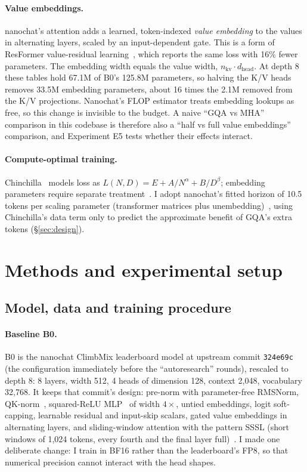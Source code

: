 \documentclass[10pt,twocolumn]{article}
\newcommand{\BO}{B0}
\begin{document}
\paragraph{Value embeddings.}
nanochat's attention adds a learned, token-indexed \emph{value embedding} to the values in alternating layers, scaled
by an input-dependent gate. This is a form of ResFormer value-residual learning~\cite{zhou2024value}, which reports
the same loss with 16\% fewer parameters. The embedding width equals the value width, $n_\text{kv}\cdot d_\text{head}$.
At depth 8 these tables hold 67.1M of B0's 125.8M parameters, so halving the K/V heads removes 33.5M embedding
parameters, about 16 times the 2.1M removed from the K/V projections. Nanochat's FLOP estimator treats embedding lookups as free,
so this change is invisible to the budget. A naive ``GQA vs MHA'' comparison in this codebase is therefore also a
``half vs full value embeddings'' comparison, and Experiment E5 tests whether their effects interact.

\paragraph{Compute-optimal training.}
Chinchilla~\cite{hoffmann2022chinchilla} models loss as $L(N,D)=E+A/N^{\alpha}+B/D^{\beta}$; embedding parameters
require separate treatment~\cite{kaplan2020scaling}. I adopt nanochat's fitted horizon of 10.5 tokens per scaling
parameter (transformer matrices plus unembedding)~\cite{karpathy2025nanochat}, using Chinchilla's data term only to
predict the approximate benefit of GQA's extra tokens (\S\ref{sec:design}).

\section{Methods and experimental setup}
\subsection{Model, data and training procedure}
\paragraph{Baseline \BO.}
B0 is the nanochat ClimbMix leaderboard model at upstream commit \texttt{324e69c} (the configuration immediately before
the ``autoresearch'' rounds), rescaled to depth 8: 8 layers, width 512, 4 heads of dimension 128, context 2{,}048,
vocabulary 32{,}768. It keeps that commit's design: pre-norm with parameter-free RMSNorm, QK-norm~\cite{henry2020qknorm},
squared-ReLU MLP~\cite{so2021primer} of width $4\times$, untied embeddings, logit soft-capping, learnable residual and
input-skip scalars, gated value embeddings in alternating layers, and sliding-window attention with the
pattern SSSL (short windows of 1{,}024 tokens, every fourth and the final layer full)~\cite{beltagy2020longformer}.
I made one deliberate change: I train in BF16 rather than the leaderboard's FP8, so that numerical precision cannot
interact with the head shapes.
\end{document}
